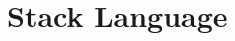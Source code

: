 \documentclass[12pt]{article}
\newcommand{\nil}{[]}
\newcommand{\h}[1]{\hat{#1}}
\renewcommand{\rule}{\textsc}
\newcommand{\sg}{\sigma}
\renewcommand{\phi}{\varphi}
\newcommand{\De}{\Delta}
\newcommand{\E}{\mathcal{E}}
\newcommand{\C}{\mathcal{C}}
\newcommand{\D}{\mathcal{D}}
\newcommand{\T}{\mathcal{T}}
\newcommand{\n}[1]{\overline{#1}}
\newcommand{\lam}[2]{\lambda #1. #2}
\newcommand{\app}{\;}
\newcommand{\sub}[3]{#1[#2/#3]}
\newcommand{\subs}[2]{#1[#2]}
\newcommand{\wo}{\backslash}
\newcommand{\ninf}[1]{\AxiomC{#1}}
\newcommand{\uinf}[1]{\UnaryInfC{#1}}
\newcommand{\binf}[1]{\BinaryInfC{#1}}
\newcommand{\tinf}[1]{\TrinaryInfC{#1}}
\newcommand{\prem}[2]{\noLine \ninf{$#1$} \uinf{#2}}
\newcommand{\tra}[4]{\ensuremath{#1; #2 \vdash #3 \rhd #4}}
\newcommand{\ev}[2]{\ensuremath{#1 \downarrow #2}}
\newcommand{\hev}[3]{\ensuremath{#1 \vdash #2 \Downarrow #3}}
\newcommand{\cor}[2]{\ensuremath{#1 \rightsquigarrow #2}}
\newcommand{\comp}[3]{\ensuremath{#1 \stackrel{#2}{\rightsquigarrow} #3}}
\newcommand{\e}{e} %
\renewcommand{\c}{c} %
\renewcommand{\b}{b} %
\renewcommand{\v}{v} %
\renewcommand{\h}{h}
\newcommand{\B}{B}
\newcommand{\slam}{\mathtt{mkclos} \;}
\newenvironment{proof}[1][Proof]{
\paragraph{#1}
}{
\begin{flushright}
$\blacksquare$
\end{flushright}
}
\begin{document}
%
%
%
%
%
%

\section*{Stack Language}

\renewcommand{\lam}[2]{\slam{#2}}

\end{document}
